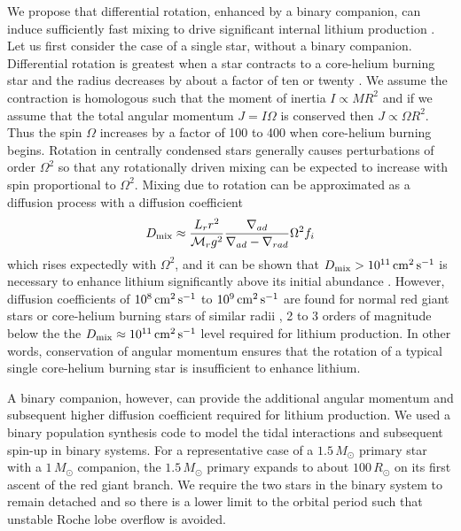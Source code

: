 \documentclass[twocolumn]{aastex62}
\begin{document}
We propose that differential rotation, enhanced by a binary companion, can induce sufficiently fast mixing to drive significant internal lithium production \citep{Costa_2002}. 
Let us first consider the case of a single star, without a binary companion.
Differential rotation is greatest when a star contracts to a core-helium burning star and the radius decreases by about a factor of ten or twenty \citep{Despain_1981}. We assume the contraction is homologous such that the moment of inertia  $I \propto MR^2$ and if we assume that the total angular momentum $J = I\Omega$ is conserved then $J \propto \Omega{}R^2$. Thus the spin $\Omega$ increases by a factor of 100 to 400 when core-helium burning begins. Rotation in centrally condensed stars \citep{Eddington_1929} generally causes perturbations of order $\Omega^2$ so that any rotationally driven mixing can be expected to increase with spin proportional to $\Omega^2$. 
Mixing due to rotation can be approximated as a diffusion process with a diffusion coefficient
\begin{equation}
D_{\rm mix} \approx \frac{L_{r}r^2}{\mathcal{M}_{r}g^{2}}\frac{\nabla_{ad}}{\nabla_{ad} - \nabla_{rad}}\Omega^2{f_i}
\end{equation}
\noindent{}which rises expectedly with $\Omega^2$, and it can be shown that $D_{\rm mix} > 10^{11}\,{\rm cm}^2\,{\rm s}^{-1}$ is necessary to enhance lithium significantly above its initial abundance \citep{Denissenkov_2004}. However, diffusion coefficients of $10^8\,{\rm cm}^2\,{\rm s}^{-1}$ to $10^9\,{\rm cm}^2\,{\rm s}^{-1}$ are found for normal red giant stars or core-helium burning stars of similar radii \citep{Denissenkov_2004,Palacios_2006}, 2 to 3 orders of magnitude below the the ${D_{\rm mix} \approx 10^{11}\,{\rm cm}^2\,{\rm s}^{-1}}$ level required for lithium production. 
In other words, conservation of angular momentum ensures that the rotation of a typical single core-helium burning star is insufficient to enhance lithium. 


A binary companion, however, can provide the additional angular momentum and subsequent higher
diffusion coefficient required for lithium production. We used a binary population 
synthesis code \citep{Hurley_2002} to model the tidal interactions and subsequent spin-up in binary systems.
For a representative case of a $1.5\,M_\odot$ primary star with a $1\,M_\odot$ companion,
the $1.5\,M_\odot$ primary expands to about $100\,R_\odot$ on its first 
ascent of the red giant branch. We require the two stars in the binary system 
to remain detached and so there
is a lower limit to the orbital period such that unstable Roche lobe overflow is avoided.
\end{document}
